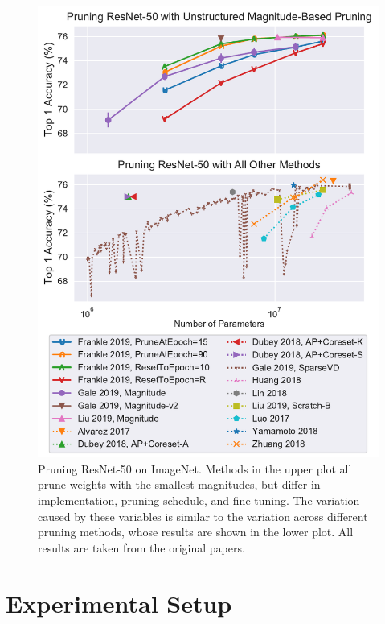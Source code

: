\begin{figure}[h]
\begin{center}
\includegraphics[width=\linewidth]{magnitude_vs_nonmagnitude}
\caption{Pruning ResNet-50 on ImageNet. Methods in the upper plot all prune weights with the smallest magnitudes, but differ in implementation, pruning schedule, and fine-tuning. The variation caused by these variables is similar to the variation across different pruning methods, whose results are shown in the lower plot. All results are taken from the original papers.}
\label{fig:magnitude_vs_nonmagnitude}
\end{center}
\vspace*{3mm}
\end{figure}


\section{Experimental Setup} \label{apx:exp}


